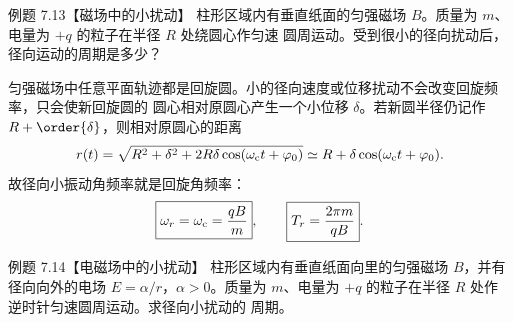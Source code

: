 \Needspace{0.35\textheight}
\begin{origexamplebox}{例题 7.13【磁场中的小扰动】}
柱形区域内有垂直纸面的匀强磁场 $B$。质量为 $m$、电量为 $+q$ 的粒子在半径 $R$ 处绕圆心作匀速
圆周运动。受到很小的径向扰动后，径向运动的周期是多少？
\end{origexamplebox}

\begin{xesolution}
匀强磁场中任意平面轨迹都是回旋圆。小的径向速度或位移扰动不会改变回旋频率，只会使新回旋圆的
圆心相对原圆心产生一个小位移 $\delta$。若新圆半径仍记作 $R+\order{\delta}$，则相对原圆心的距离
\[
  r(t)=\sqrt{R^2+\delta^2+2R\delta\cos(\omega_{\rm c}t+\varphi_0)}
  \simeq R+\delta\cos(\omega_{\rm c}t+\varphi_0).
\]
故径向小振动角频率就是回旋角频率：
\begin{equation}
  \boxed{\omega_r=\omega_{\rm c}=\frac{qB}{m}},
  \qquad
  \boxed{T_r=\frac{2\pi m}{qB}}.
\end{equation}

\epicycleDiagram
\end{xesolution}

\Needspace{0.47\textheight}
\begin{origexamplebox}{例题 7.14【电磁场中的小扰动】}
柱形区域内有垂直纸面向里的匀强磁场 $B$，并有径向向外的电场
$E=\alpha/r$，$\alpha>0$。质量为 $m$、电量为 $+q$ 的粒子在半径 $R$ 处作逆时针匀速圆周运动。求径向小扰动的
周期。

\begin{center}
\end{center}
\label{fig:em22-question-14}
\end{origexamplebox}

